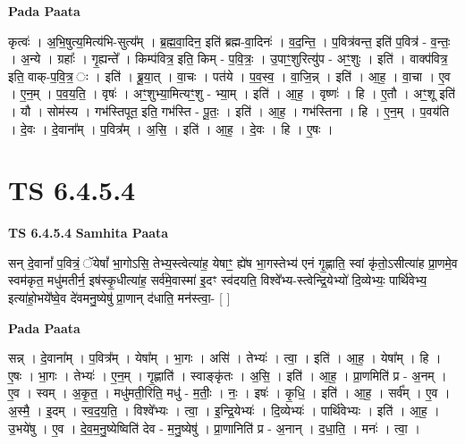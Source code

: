 \documentclass[17pt]{extarticle}
\begin{document}
\textbf{Pada Paata} \newline

कृत्वः॑ । अ॒भि॒षुत्य॒मित्य॑भि-सुत्य᳚म् । ब्र॒ह्म॒वा॒दिन॒ इति॑ ब्रह्म-वा॒दिनः॑ । व॒द॒न्ति॒ । प॒वित्र॑वन्त॒ इति॑ प॒वित्र॑ - व॒न्तः॒ । अ॒न्ये । ग्रहाः᳚ । गृ॒ह्यन्ते᳚ । किम्प॑वित्र॒ इति॒ किम् - प॒वि॒त्रः॒ । उ॒पाꣳ॒॒शुरित्यु॑प - अꣳ॒॒शुः । इति॑ । वाक्प॑वित्र॒ इति॒ वाक्-प॒वि॒त्र॒ ः । इति॑ । ब्रू॒या॒त् । वा॒चः । पत॑ये । प॒व॒स्व॒ । वा॒जि॒न्न् । इति॑ । आ॒ह॒ । वा॒चा । ए॒व । ए॒न॒म् । प॒व॒य॒ति॒ । वृषः॑ । अꣳ॒॒शुभ्या॒मित्यꣳ॒॒शु - भ्या॒म् । इति॑ । आ॒ह॒ । वृष्णः॑ । हि । ए॒तौ । अꣳ॒॒शू इति॑ । यौ । सोम॑स्य । गभ॑स्तिपूत॒ इति॒ गभ॑स्ति - पू॒तः॒ । इति॑ । आ॒ह॒ । गभ॑स्तिना । हि । ए॒न॒म् । प॒वय॑ति । दे॒वः । दे॒वाना᳚म् । प॒वित्र᳚म् । अ॒सि॒ । इति॑ । आ॒ह॒ । दे॒वः । हि । ए॒षः ।  \newline




\section*{ TS 6.4.5.4 }

\textbf{TS 6.4.5.4 } \newline
\textbf{Samhita Paata} \newline

सन् दे॒वानां᳚ प॒वित्रं॒ ॅयेषां᳚ भा॒गोऽसि॒ तेभ्य॒स्त्वेत्या॑ह॒ येषाꣳ॒॒ ह्ये॑ष भा॒गस्तेभ्य॑ एनं गृ॒ह्णाति॒ स्वां कृ॑तो॒ऽसीत्या॑ह प्रा॒णमे॒व स्वम॑कृत॒ मधु॑मतीर्न॒ इष॑स्कृ॒धीत्या॑ह॒ सर्व॑मे॒वास्मा॑ इ॒दꣳ स्व॑दयति॒ विश्वे᳚भ्य-स्त्वेन्द्रि॒येभ्यो॑ दि॒व्येभ्यः॒ पार्थि॑वेभ्य॒ इत्या॑हो॒भये᳚ष्वे॒व दे॑वमनु॒ष्येषु॑ प्रा॒णान् द॑धाति॒ मन॑स्त्वा॒- [  ] \newline

\textbf{Pada Paata} \newline

सन्न् । दे॒वाना᳚म् । प॒वित्र᳚म् । येषा᳚म् । भा॒गः । असि॑ । तेभ्यः॑ । त्वा॒ । इति॑ । आ॒ह॒ । येषा᳚म् । हि । ए॒षः । भा॒गः । तेभ्यः॑ । ए॒न॒म् । गृ॒ह्णाति॑ । स्वाङ्कृ॑तः । अ॒सि॒ । इति॑ । आ॒ह॒ । प्रा॒णमिति॑ प्र - अ॒नम् । ए॒व । स्वम् । अ॒कृ॒त॒ । मधु॑मती॒रिति॒ मधु॑ - म॒तीः॒ । नः॒ । इषः॑ । कृ॒धि॒ । इति॑ । आ॒ह॒ । सर्व᳚म् । ए॒व । अ॒स्मै॒ । इ॒दम् । स्व॒द॒य॒ति॒ । विश्वे᳚भ्यः । त्वा॒ । इ॒न्द्रि॒येभ्यः॑ । दि॒व्येभ्यः॑ । पार्थि॑वेभ्यः । इति॑ । आ॒ह॒ । उ॒भये॑षु । ए॒व । दे॒व॒म॒नु॒ष्येष्विति॑ देव - म॒नु॒ष्येषु॑ । प्रा॒णानिति॑ प्र - अ॒नान् । द॒धा॒ति॒ । मनः॑ । त्वा॒ ।  \newline
\end{document}
